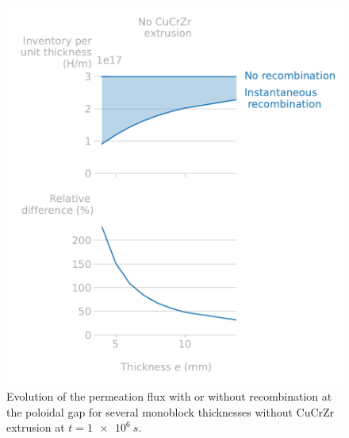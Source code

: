 \begin{figure} [h]
    \centering
    \includegraphics[width=\linewidth]{Figures/Chapter3/monoblocks/3D_monoblocks/inventory_vs_thickness_no_gap.pdf}
    \caption{Evolution of the permeation flux with or without recombination at the poloidal gap for several monoblock thicknesses without CuCrZr extrusion at $t=\SI{1e6}{s}$.}
\end{figure}

